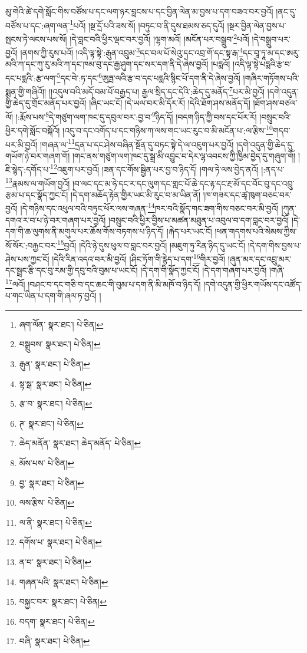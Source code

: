 མུ་གེའི་ཚེ་དགེ་སློང་གིས་བཙོས་པ་དང་ལག་ཉར་བླངས་པ་དང་བྱིན་ལེན་མ་བྱས་པ་དག་བཟའ་བར་བྱའོ། །ནང་དུ་བཙོས་པ་དང་:ཞག་ལན་\footnote{ཞག་ལོན་  སྣར་ཐང་།  པེ་ཅིན། }པའོ། །སྔ་དྲོ་པའི་ཟས་སོ། །བཏུང་བ་ནི་དུས་ཐམས་ཅད་དུའོ། །སྔར་བྱིན་ལེན་བྱས་པ་སྤངས་ཏེ་ལངས་པས་སོ། །དེ་བླང་བའི་ཕྱིར་ལྡང་བར་བྱའོ། །ལྷག་མའོ། །མངོན་པར་བསྒྲུབ་\footnote{བསྒྲུབས་  སྣར་ཐང་།  པེ་ཅིན། }པའོ། །དེ་བསྒྲུབ་པར་བྱའོ། །ནགས་ཀྱི་རུས་པའོ། །འདི་ལྟ་སྟེ་:རྒུན་འབྲུམ་\footnote{རྒུན་  སྣར་ཐང་།  པེ་ཅིན། }དང་བལ་པོ་སེའུ་དང་འབྲ་གོ་དང་སྟ་རྒ་\footnote{སྟ་སྒ་  སྣར་ཐང་།  པེ་ཅིན། }དང་བཱ་ཏཱ་མ་དང་ཨརུ་མའི་ཀ་དང་ཀུ་རུ་མའི་ཀ་དང་ཁམ་བུ་དང་རྒྱ་ཤུག་དང་སར་དག་ནི་དེ་ཞེས་བྱའོ། །པདྨའོ། །འདི་ལྟ་སྟེ་པདྨའི་རྩ་བ་དང་པདྨའི་:རྩ་ལག་\footnote{རྩ་བ་  སྣར་ཐང་།  པེ་ཅིན། }དང་བེ་:ཏ་དང་\footnote{ཊ་  སྣར་ཐང་།  པེ་ཅིན། }ཨུཏྤ་ལའི་རྩ་བ་དང་པདྨའི་སྙིང་པོ་དག་ནི་དེ་ཞེས་བྱའོ། །གཞིར་གཏོགས་པའི་སྨན་གྱི་གཞིའོ།། །།འདུལ་བའི་མདོ་བམ་པོ་བརྒྱད་པ། རྒྱལ་སྲིད་དང་དེའི་:ཆེད་དུ་མནོད་\footnote{ཆེད་མནོན་  སྣར་ཐང་། ཆེད་མནོད་  པེ་ཅིན། }པར་མི་བྱའོ། །དགེ་འདུན་གྱི་ཆེད་དུ་གྲོང་མནོད་པར་བྱའོ། །ཞིང་ཡང་ངོ། །དེ་ཡལ་བར་མི་དོར་རོ། །དེའི་ཐོག་ཤས་མནོད་དོ། །ཐོག་ཤས་བཙལ་ལོ། །:རྨོས་པས་\footnote{མོས་པས་  པེ་ཅིན། }དེ་གཙུག་ལག་ཁང་དུ་དབུལ་བར་:བྱ་བ་\footnote{བྱ་  སྣར་ཐང་།  པེ་ཅིན། }ཉིད་དོ། །བདག་ཉིད་ཀྱི་བས་དང་པོར་རོ། །བསྲུང་བའི་ཕྱིར་དགེ་སློང་བསྐོའོ། །འདུ་བ་དང་འགོད་པ་དང་གཉིས་ཀ་ལས་གང་ཡང་རུང་བ་མི་མངོན་པ་:ལ་རྩིས་\footnote{ལས་རྩིས་  པེ་ཅིན། }གདབ་པར་མི་བྱའོ། །གཞན་ལ་\footnote{ལ་ནི་  སྣར་ཐང་།  པེ་ཅིན། }དྲན་པ་དང་ཤེས་བཞིན་སྔོན་དུ་བཏང་སྟེ་དེ་ལ་འཇུག་པར་བྱའོ། །དགེ་འདུན་གྱི་ཆེད་དུ་གཡོག་ཉེ་བར་གཞག་གོ། །གང་ནས་གཙུག་ལག་ཁང་དུ་སྒྲ་མི་འབྱུང་བ་དེར་ལྷ་འབངས་ཀྱི་ཁྱིམ་བྱེད་དུ་གཞུག་གོ། །ཇི་སྙེད་:དགོད་པ་\footnote{དགོས་པ་  སྣར་ཐང་།  པེ་ཅིན། }འཇུག་པར་བྱའོ། །ཟན་དང་གོས་སྦྱིན་པར་བྱ་བ་ཉིད་དོ། །གལ་ཏེ་ལས་བྱེད་ནའོ། །:ནད་པ་\footnote{ན་བ་  སྣར་ཐང་།  པེ་ཅིན། }རྣམས་ལ་གཡོག་བྱའོ། །བ་ལང་དང་མ་ཧེ་དང་ར་དང་ལུག་དང་གླང་པོ་ཆེ་དང་རྟ་དང་རྔ་མོ་དང་བོང་བུ་དང་འབྲུ་རྩམ་པ་དང་སྣོད་ཀྱང་ངོ། །དེ་དག་མཆོད་རྟེན་གྱིར་ཡང་མི་རུང་བ་མ་ཡིན་ནོ། །ཁ་གཟར་དང་ཚྭ་ཁུག་བཅང་བར་བྱའོ། །དེ་གཉིས་དང་འཕུལ་བའི་བཏུང་ཕོར་ལས་གཞན་\footnote{གཞན་པའི་  སྣར་ཐང་།  པེ་ཅིན། }ཁར་བའི་སྣོད་གང་ཟག་གིས་བཅང་བར་མི་བྱའོ། །ཀུན་དགའ་ར་བ་པ་ཉེ་བར་གཞག་པར་བྱའོ། །བསྲུང་བའི་ཕྱིར་བྱིས་པ་མཚན་མཐུན་པ་འབུལ་བ་དག་བླང་བར་བྱའོ། །དེ་དག་གི་ཆ་ལུགས་ནི་མགུལ་པར་ཆོས་གོས་བཏགས་པ་ཉིད་དོ། །རྐེད་པར་ཡང་ངོ། །ཕན་གདགས་པའི་སེམས་ཀྱིས་སོ་སོར་:བརྐྱང་བར་\footnote{བསྐྱང་བར་  སྣར་ཐང་།  པེ་ཅིན། }བྱའོ། །དེའི་ཉེ་དུས་ཕུལ་བ་བླང་བར་བྱའོ། །མཇུག་ཏུ་རིན་ཉིད་དུ་ཡང་ངོ། །དེ་དག་གིས་བྱས་པ་ཤེས་པས་ཀྱང་ངོ། །དེའི་རིན་འདའ་བར་མི་བྱའོ། །ཤིང་ཏོག་གི་རྙེད་པ་དག་\footnote{བདག་  སྣར་ཐང་།  པེ་ཅིན། }གིར་བྱའོ། །ཞུན་མར་དང་འབྲུ་མར་དང་སྦྲང་རྩི་དང་བུ་རམ་གྱི་དབུ་བའི་བུམ་པ་ཡང་ངོ། །དེ་དག་གི་སྣོད་ཀྱང་ངོ། །དེ་དག་གཞག་པར་བྱའོ། །གཞི་\footnote{བཞི་  སྣར་ཐང་།  པེ་ཅིན། }ལའོ། །བཤང་བ་དང་གཅི་བ་དང་ཆང་གི་བུམ་པ་དག་ནི་མི་མཁོ་བ་ཉིད་དོ། །དགེ་འདུན་གྱི་ཕྱིར་གཡོས་དང་འཚོད་པ་གང་ཡིན་པ་དག་གི་ཞལ་ཏ་བྱའོ། །
